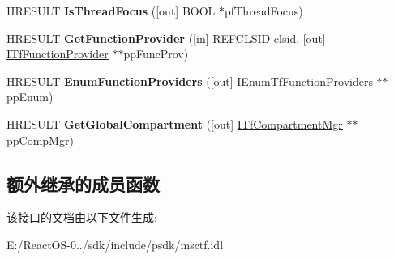 \begin{DoxyCompactItemize}
\item 
\mbox{\label{interface_i_tf_thread_mgr_a87f9436030076748a9fcfcca85892f52}} 
H\+R\+E\+S\+U\+LT {\bfseries Is\+Thread\+Focus} (\mbox{[}out\mbox{]} B\+O\+OL $\ast$pf\+Thread\+Focus)
\item 
\mbox{\label{interface_i_tf_thread_mgr_af21151e84f149805be9e75ff80fd11ce}} 
H\+R\+E\+S\+U\+LT {\bfseries Get\+Function\+Provider} (\mbox{[}in\mbox{]} R\+E\+F\+C\+L\+S\+ID clsid, \mbox{[}out\mbox{]} \hyperlink{interface_i_tf_function_provider}{I\+Tf\+Function\+Provider} $\ast$$\ast$pp\+Func\+Prov)
\item 
\mbox{\label{interface_i_tf_thread_mgr_a98c2d581594a0d8ab0aa7fe38ebadc2c}} 
H\+R\+E\+S\+U\+LT {\bfseries Enum\+Function\+Providers} (\mbox{[}out\mbox{]} \hyperlink{interface_i_enum_tf_function_providers}{I\+Enum\+Tf\+Function\+Providers} $\ast$$\ast$pp\+Enum)
\item 
\mbox{\label{interface_i_tf_thread_mgr_af6066c4a4b1d5502433323364313e810}} 
H\+R\+E\+S\+U\+LT {\bfseries Get\+Global\+Compartment} (\mbox{[}out\mbox{]} \hyperlink{interface_i_tf_compartment_mgr}{I\+Tf\+Compartment\+Mgr} $\ast$$\ast$pp\+Comp\+Mgr)
\end{DoxyCompactItemize}
\subsection*{额外继承的成员函数}


该接口的文档由以下文件生成\+:\begin{DoxyCompactItemize}
\item 
E\+:/\+React\+O\+S-\/0../sdk/include/psdk/msctf.\+idl\end{DoxyCompactItemize}
